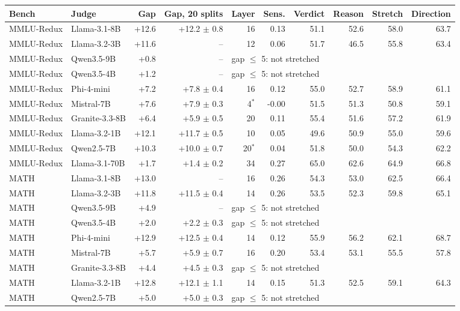 \begin{tabular}{ll rr rr rrrr}
\toprule
Bench & Judge & Gap & Gap, 20 splits & Layer & Sens. & Verdict & Reason & Stretch & Direction \\
\midrule
MMLU-Redux & Llama-3.1-8B & +12.6 & +12.2 $\pm$ 0.8 & 16 & 0.13 & 51.1 & 52.6 & 58.0 & 63.7 \\
MMLU-Redux & Llama-3.2-3B & +11.6 & -- & 12 & 0.06 & 51.7 & 46.5 & 55.8 & 63.4 \\
MMLU-Redux & Qwen3.5-9B & +0.8 & -- & \multicolumn{6}{l}{gap $\le$ 5: not stretched} \\
MMLU-Redux & Qwen3.5-4B & +1.2 & -- & \multicolumn{6}{l}{gap $\le$ 5: not stretched} \\
MMLU-Redux & Phi-4-mini & +7.2 & +7.8 $\pm$ 0.4 & 16 & 0.12 & 55.0 & 52.7 & 58.9 & 61.1 \\
MMLU-Redux & Mistral-7B & +7.6 & +7.9 $\pm$ 0.3 & 4$^*$ & -0.00 & 51.5 & 51.3 & 50.8 & 59.1 \\
MMLU-Redux & Granite-3.3-8B & +6.4 & +5.9 $\pm$ 0.5 & 20 & 0.11 & 55.4 & 51.6 & 57.2 & 61.9 \\
MMLU-Redux & Llama-3.2-1B & +12.1 & +11.7 $\pm$ 0.5 & 10 & 0.05 & 49.6 & 50.9 & 55.0 & 59.6 \\
MMLU-Redux & Qwen2.5-7B & +10.3 & +10.0 $\pm$ 0.7 & 20$^*$ & 0.04 & 51.8 & 50.0 & 54.3 & 62.2 \\
MMLU-Redux & Llama-3.1-70B & +1.7 & +1.4 $\pm$ 0.2 & 34 & 0.27 & 65.0 & 62.6 & 64.9 & 66.8 \\
\midrule
MATH & Llama-3.1-8B & +13.0 & -- & 16 & 0.26 & 54.3 & 53.0 & 62.5 & 66.4 \\
MATH & Llama-3.2-3B & +11.8 & +11.5 $\pm$ 0.4 & 14 & 0.26 & 53.5 & 52.3 & 59.8 & 65.1 \\
MATH & Qwen3.5-9B & +4.9 & -- & \multicolumn{6}{l}{gap $\le$ 5: not stretched} \\
MATH & Qwen3.5-4B & +2.0 & +2.2 $\pm$ 0.3 & \multicolumn{6}{l}{gap $\le$ 5: not stretched} \\
MATH & Phi-4-mini & +12.9 & +12.5 $\pm$ 0.4 & 14 & 0.12 & 55.9 & 56.2 & 62.1 & 68.7 \\
MATH & Mistral-7B & +5.7 & +5.9 $\pm$ 0.7 & 16 & 0.20 & 53.4 & 53.1 & 55.5 & 57.8 \\
MATH & Granite-3.3-8B & +4.4 & +4.5 $\pm$ 0.3 & \multicolumn{6}{l}{gap $\le$ 5: not stretched} \\
MATH & Llama-3.2-1B & +12.8 & +12.1 $\pm$ 1.1 & 14 & 0.15 & 51.3 & 52.5 & 59.1 & 64.3 \\
MATH & Qwen2.5-7B & +5.0 & +5.0 $\pm$ 0.3 & \multicolumn{6}{l}{gap $\le$ 5: not stretched} \\

\end{tabular}

